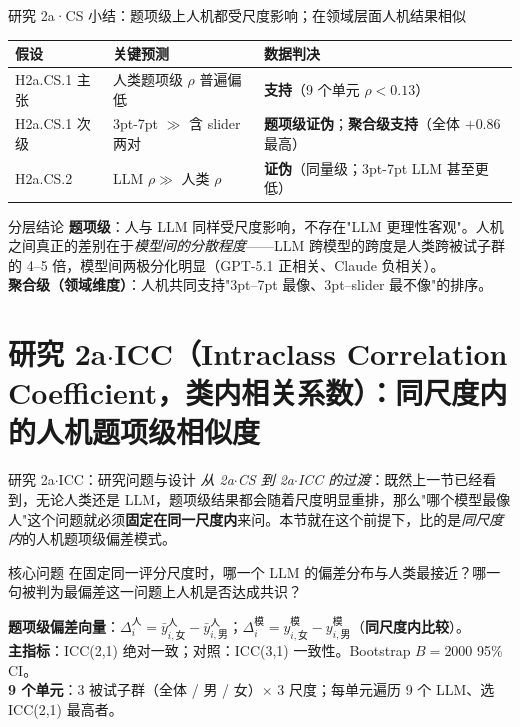 \documentclass[aspectratio=169,professionalfonts]{beamer}
\begin{document}
\begin{frame}{研究 2a·CS 小结：题项级上人机都受尺度影响；在领域层面人机结果相似}
  \small
  \setlength{\tabcolsep}{3pt}
  \begin{table}
    \centering
    \begin{tabular}{lll}
      \toprule
      假设 & 关键预测 & 数据判决 \\
      \midrule
      H2a.CS.1 主张 & 人类题项级 $\rho$ 普遍偏低 & \textbf{支持}（9 个单元 $\rho<0.13$） \\
      H2a.CS.1 次级 & 3pt-7pt $\gg$ 含 slider 两对 & \textbf{题项级证伪}；\textbf{聚合级支持}（全体 $+0.86$ 最高） \\
      H2a.CS.2     & LLM $\rho \gg$ 人类 $\rho$ & \textbf{证伪}（同量级；3pt-7pt LLM 甚至更低） \\
      \bottomrule
    \end{tabular}
  \end{table}

  \vspace{0.3em}
  \begin{block}{分层结论}
    \small \textbf{题项级}：人与 LLM 同样受尺度影响，不存在"LLM 更理性客观"。人机之间真正的差别在于\emph{模型间的分散程度}——LLM 跨模型的跨度是人类跨被试子群的 4--5 倍，模型间两极分化明显（GPT-5.1 正相关、Claude 负相关）。\\
    \textbf{聚合级（领域维度）}：人机共同支持"3pt--7pt 最像、3pt--slider 最不像"的排序。
  \end{block}
\end{frame}

\section{研究 2a$\cdot$ICC（Intraclass Correlation Coefficient，类内相关系数）：同尺度内的人机题项级相似度}

\begin{frame}{研究 2a$\cdot$ICC：研究问题与设计}
  \small\emph{从 2a$\cdot$CS 到 2a$\cdot$ICC 的过渡}：既然上一节已经看到，无论人类还是 LLM，题项级结果都会随着尺度明显重排，那么"哪个模型最像人"这个问题就必须\textbf{固定在同一尺度内}来问。本节就在这个前提下，比的是\emph{同尺度内}的人机题项级偏差模式。

  \begin{block}{核心问题}
    \small 在固定同一评分尺度时，哪一个 LLM 的偏差分布与人类最接近？哪一句被判为最偏差这一问题上人机是否达成共识？
  \end{block}

  \vspace{0.8em}
  \small \textbf{题项级偏差向量}：$\Delta_i^\text{人} = \bar{y}_{i,\text{女}}^\text{人} - \bar{y}_{i,\text{男}}^\text{人}$；$\Delta_i^\text{模} = y_{i,\text{女}}^\text{模} - y_{i,\text{男}}^\text{模}$（\textbf{同尺度内比较}）。\\[0.5em]
  \small \textbf{主指标}：ICC(2,1) 绝对一致；对照：ICC(3,1) 一致性。Bootstrap $B = 2000$ 95\% CI。\\[0.5em]
  \small \textbf{9 个单元}：3 被试子群（全体 / 男 / 女）$\times$ 3 尺度；每单元遍历 9 个 LLM、选 ICC(2,1) 最高者。
\end{frame}
\end{document}
